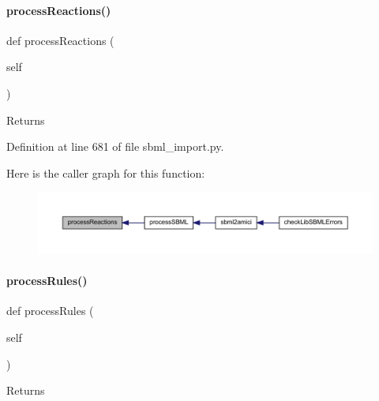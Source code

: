 \paragraph{\texorpdfstring{process\+Reactions()}{processReactions()}}
{\footnotesize\ttfamily def process\+Reactions (\begin{DoxyParamCaption}\item[{}]{self }\end{DoxyParamCaption})}

\begin{DoxyReturn}{Returns}

\end{DoxyReturn}


Definition at line 681 of file sbml\+\_\+import.\+py.

Here is the caller graph for this function\+:
\nopagebreak
\begin{figure}[H]
\begin{center}
\leavevmode
\includegraphics[width=350pt]{classamici_1_1sbml__import_1_1_sbml_importer_adbdd8e9af99679633109829d94b3fd3e_icgraph}
\end{center}
\end{figure}
\mbox{\label{classamici_1_1sbml__import_1_1_sbml_importer_a7df6b4ae4e3e757bc8de5e0cc54fe16b}} 
\paragraph{\texorpdfstring{process\+Rules()}{processRules()}}
{\footnotesize\ttfamily def process\+Rules (\begin{DoxyParamCaption}\item[{}]{self }\end{DoxyParamCaption})}

\begin{DoxyReturn}{Returns}

\end{DoxyReturn}


